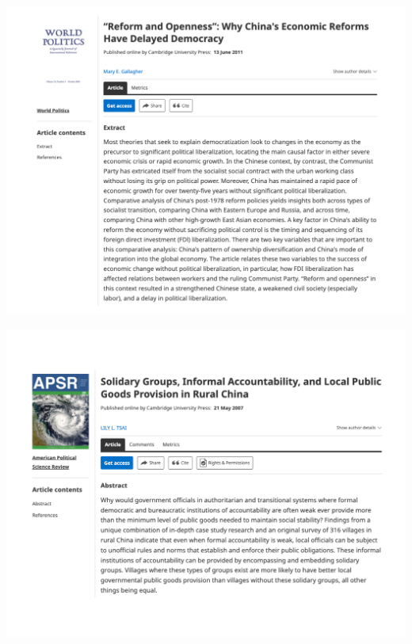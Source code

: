 \documentclass[
  10pt,
  ignorenonframetext,
]{beamer}
\begin{document}
\begin{frame}
\begin{center}\includegraphics[width=1\linewidth]{Figs/mary} \end{center}
\end{frame}

\begin{frame}
\begin{center}\includegraphics[width=1\linewidth]{Figs/tsai} \end{center}
\end{frame}
\end{document}
